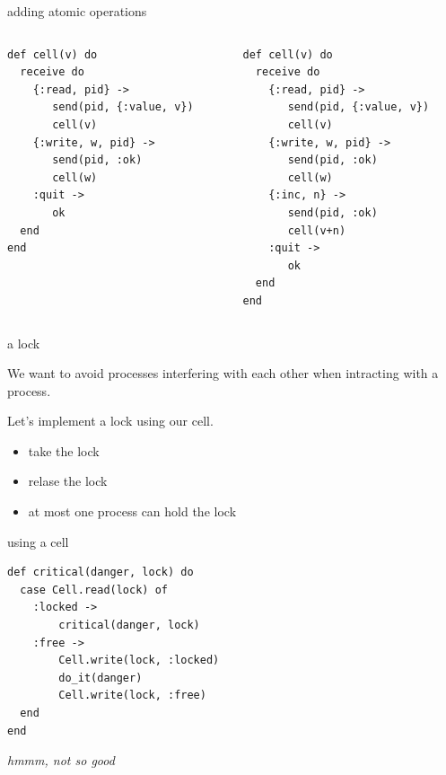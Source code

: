 \begin{frame}[fragile]{adding atomic operations}

\begin{columns}
 \begin{column}{0.5\linewidth}
\begin{verbatim}
def cell(v) do
  receive do
    {:read, pid} ->
       send(pid, {:value, v})
       cell(v)
    {:write, w, pid} ->
       send(pid, :ok)
       cell(w)
    :quit ->
       ok
  end
end
\end{verbatim}
 \end{column}
\pause
 \begin{column}{0.5\linewidth}
\begin{verbatim}
def cell(v) do
  receive do
    {:read, pid} ->
       send(pid, {:value, v})
       cell(v)
    {:write, w, pid} ->
       send(pid, :ok)
       cell(w)
    {:inc, n} ->
       send(pid, :ok)
       cell(v+n)       
    :quit ->
       ok
  end
end
\end{verbatim}
 \end{column}
\end{columns}

\end{frame}

\begin{frame}[fragile]{a lock}

\vspace{10pt}

We want to avoid processes interfering with each other when intracting
with a process.

\vspace{10pt}
Let's implement a lock using our cell.

\pause
\begin{itemize}
 \item take the lock
 \item relase the lock
 \item at most one process can hold the lock
\end{itemize}

\end{frame}


\begin{frame}[fragile]{using a cell}

\pause\vspace{20pt}

\begin{verbatim}
def critical(danger, lock) do
  case Cell.read(lock) of
    :locked ->
        critical(danger, lock)
    :free ->
        Cell.write(lock, :locked)
        do_it(danger)
        Cell.write(lock, :free)
  end
end 
\end{verbatim}

\pause\vspace{20pt}
{\em hmmm, not so good}

\end{frame}

